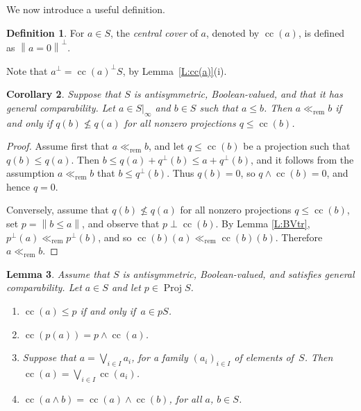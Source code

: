 \documentclass[psamsfonts,reqno]{memo-l}
\theoremstyle{plain}
\newtheorem{lemma}{Lemma}[section]
\newtheorem{corollary}[lemma]{Corollary}
\theoremstyle{definition}
\newtheorem{definition}[lemma]{Definition}
\theoremstyle{remark}
\numberwithin{equation}{section}
\renewcommand{\iff}{if and only if}
\newcommand{\rem}{\ll_{\mathrm{rem}}}
\newcommand{\DI}[1]{#1|_{\infty}}
\newcommand{\bv}[1]{\left\|#1\right\|}
\DeclareMathOperator{\cc}{cc}
\DeclareMathOperator{\BB}{Proj}
\newcommand{\famm}[2]{(#1)_{#2}}
\begin{document}
We now introduce a useful definition.

\begin{definition}\label{D:cc(a)}
For $a\in S$, the \emph{central cover} of $a$,
denoted by $\cc(a)$, \index{czzca@$\cc(a)$|ii} is
defined as $\bv{a=0}^\bot$.
\end{definition}

Note that $a^\bot=\cc(a)^\bot S$, by Lemma~\ref{L:cc(a)}(i).

\begin{corollary}\label{C:remequiv}
Suppose that $S$ is
antisymmetric, Boolean-valued, and that it has general
comparability. Let $a\in\DI{S}$ and $b\in S$ such that $a\leq b$. Then
$a\rem b$ if and only if $q(b) \nleq q(a)$ for all nonzero projections
$q\leq \cc(b)$.
\end{corollary}

\begin{proof}
Assume first that $a\rem b$, and let $q\leq\cc(b)$ be a
projection such that $q(b)\leq q(a)$. Then $b\leq q(a)+q^\perp(b)\leq
a+q^\perp(b)$, and it follows from the assumption $a\rem b$ that
$b\leq q^\perp(b)$. Thus $q(b)=0$, so $q\wedge\cc(b)=0$, and hence $q=0$.

Conversely, assume that $q(b) \nleq q(a)$ for all nonzero projections
$q\leq \cc(b)$, set $p=\bv{b\leq a}$, and observe that $p\perp \cc(b)$. By
Lemma \ref{L:BVtr}, $p^\perp(a)\rem p^\perp(b)$, and so $\cc(b)(a)\rem
\cc(b)(b)$. Therefore $a\rem b$.
\end{proof}

\begin{lemma}\label{L:Basiccc}
Assume that $S$ is
antisymmetric, Boolean-valued, and satisfies general
comparability. Let $a\in S$ and let\index{pzzroj@$\BB{S}$} $p\in\BB{S}$.
\begin{enumerate}
\item $\cc(a)\leq p$ \iff\ $a\in pS$.

\item $\cc(p(a))=p\wedge\cc(a)$.

\item Suppose that $a=\bigvee_{i\in I}a_i$, for a family
$\famm{a_i}{i\in I}$ of elements of~$S$. Then
$\cc(a)=\bigvee_{i\in I}\cc(a_i)$.

\item $\cc(a\wedge b)=\cc(a)\wedge\cc(b)$, for all $a$, $b\in S$.
\end{enumerate}
\end{lemma}
\end{document}
